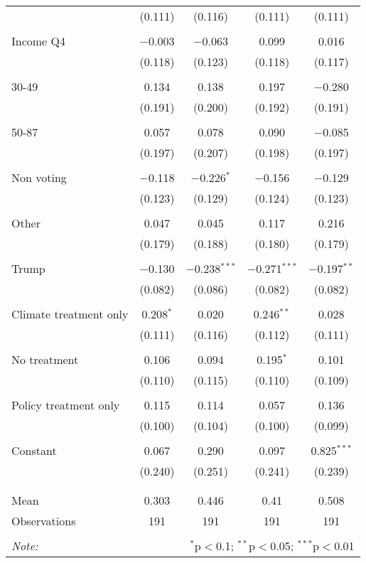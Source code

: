 \begin{tabular}{@{\extracolsep{5pt}}lcccc}
  & (0.111) & (0.116) & (0.111) & (0.111) \\ 
  & & & & \\ 
 Income Q4 & $-$0.003 & $-$0.063 & 0.099 & 0.016 \\ 
  & (0.118) & (0.123) & (0.118) & (0.117) \\ 
  & & & & \\ 
 30-49 & 0.134 & 0.138 & 0.197 & $-$0.280 \\ 
  & (0.191) & (0.200) & (0.192) & (0.191) \\ 
  & & & & \\ 
 50-87 & 0.057 & 0.078 & 0.090 & $-$0.085 \\ 
  & (0.197) & (0.207) & (0.198) & (0.197) \\ 
  & & & & \\ 
 Non voting & $-$0.118 & $-$0.226$^{*}$ & $-$0.156 & $-$0.129 \\ 
  & (0.123) & (0.129) & (0.124) & (0.123) \\ 
  & & & & \\ 
 Other & 0.047 & 0.045 & 0.117 & 0.216 \\ 
  & (0.179) & (0.188) & (0.180) & (0.179) \\ 
  & & & & \\ 
 Trump & $-$0.130 & $-$0.238$^{***}$ & $-$0.271$^{***}$ & $-$0.197$^{**}$ \\ 
  & (0.082) & (0.086) & (0.082) & (0.082) \\ 
  & & & & \\ 
 Climate treatment only & 0.208$^{*}$ & 0.020 & 0.246$^{**}$ & 0.028 \\ 
  & (0.111) & (0.116) & (0.112) & (0.111) \\ 
  & & & & \\ 
 No treatment & 0.106 & 0.094 & 0.195$^{*}$ & 0.101 \\ 
  & (0.110) & (0.115) & (0.110) & (0.109) \\ 
  & & & & \\ 
 Policy treatment only & 0.115 & 0.114 & 0.057 & 0.136 \\ 
  & (0.100) & (0.104) & (0.100) & (0.099) \\ 
  & & & & \\ 
 Constant & 0.067 & 0.290 & 0.097 & 0.825$^{***}$ \\ 
  & (0.240) & (0.251) & (0.241) & (0.239) \\ 
  & & & & \\ 
\hline \\[-1.8ex] 
Mean & 0.303 & 0.446 & 0.41 & 0.508 \\ 
Observations & 191 & 191 & 191 & 191 \\ 
\hline 
\hline \\[-1.8ex] 
\textit{Note:}  & \multicolumn{4}{r}{$^{*}$p$<$0.1; $^{**}$p$<$0.05; $^{***}$p$<$0.01} \\ 
\end{tabular} 
